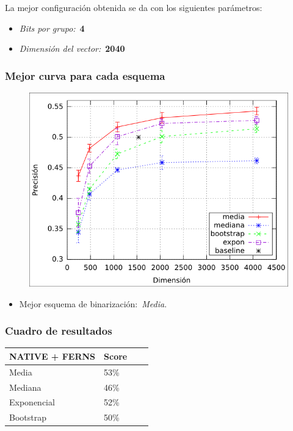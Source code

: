 		\begin{frame}
			La mejor configuración obtenida se da con los siguientes parámetros:
			\begin{itemize}
				\item<1-> \textit{Bits por grupo:}~\textbf{4}
				\item<2-> \textit{Dimensión del vector:}~\textbf{2040}
			\end{itemize}
		\end{frame}
		\begin{frame}
			\frametitle{Mejor curva para cada esquema}
			\begin{figure}[htbp!]
				\centering
				\centerline{
					\includegraphics[height=0.60\paperheight]{../img/resultados/reales/comparativa_metodos.png}
				}
			\end{figure}
			\begin{itemize}
				\centering
				\item<1-> Mejor esquema de binarización:~\textit{Media}.
			\end{itemize}
		\end{frame}
		\begin{frame}
			\frametitle{Cuadro de resultados}
			\begin{center}
				\begin{table}
					\begin{tabular}{ | l | l | l | p{5cm} |}
    					\hline
    					\textbf{NATIVE + FERNS} & \textbf{Score} \\ \hline
    					Media & 53\% \\ \hline
    					Mediana & 46\%\\ \hline
    					Exponencial & 52\% \\ \hline
    					Bootstrap & 50\%\\
    					\hline
    					\end{tabular}
   			 	\end{table}
			\end{center}
		\end{frame}
